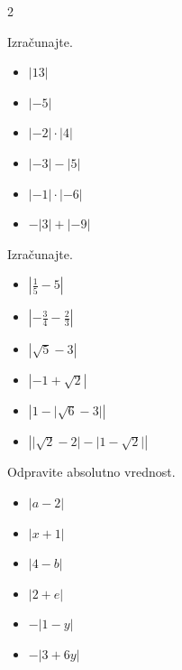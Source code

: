 \begin{multicols}{2}
    

        \begin{naloga}
            Izračunajte.
            \begin{itemize}
                \item $|13|$ 
                \item $|-5|$ 
                \item $|-2|\cdot|4|$ 
                \item $|-3|-|5|$ 
                \item $|-1|\cdot|-6|$ 
                \item $-|3|+|-9|$ 
                    
            \end{itemize}
        \end{naloga}


        \begin{naloga}
            Izračunajte.
            \begin{itemize}
                \item $\left\lvert\frac{1}{5}-5\right\rvert$ 
                \item $\left\lvert-\frac{3}{4}-\frac{2}{3}\right\rvert$ 
                \item $\left\lvert\sqrt{5}-3\right\rvert$ 
                \item $\left\lvert-1+\sqrt{2}\right\rvert$ 
                \item $\left\lvert 1-\lvert\sqrt{6}-3\rvert\right\rvert$ 
                \item $\left\lvert\lvert\sqrt{2}-2\rvert-\lvert 1-\sqrt{2}\rvert\right\rvert$ 
                    
            \end{itemize}
        \end{naloga}



        \begin{naloga}
            Odpravite absolutno vrednost.
            \begin{itemize}

                \item $\left\lvert a-2\right\rvert$ 
                \item $\left\lvert x+1\right\rvert$ 
                \item $\left\lvert 4-b\right\rvert$ 
                \item $\left\lvert 2+e\right\rvert$ 
                \item $-\left\lvert 1-y\right\rvert$ 
                \item $-\left\lvert 3+6y\right\rvert$ 
                    

\end{itemize}
\end{naloga}
\end{multicols}
